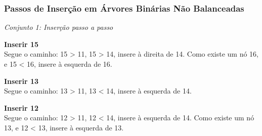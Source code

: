 \begin{frame}[fragile]
  \frametitle{Passos de Inserção em Árvores Binárias Não Balanceadas}

  \textit{Conjunto 1: Inserção passo a passo}

  \textbf{Inserir 15}\\
  Segue o caminho: 15 > 11, 15 > 14, insere à direita de 14. Como existe um nó 16, e 15 < 16, insere à esquerda de 16.

  \textbf{Inserir 13}\\
  Segue o caminho: 13 > 11, 13 < 14, insere à esquerda de 14.

  \textbf{Inserir 12}\\
  Segue o caminho: 12 > 11, 12 < 14, insere à esquerda de 14. Como existe um nó 13, e 12 < 13, insere à esquerda de 13.
\end{frame}
    